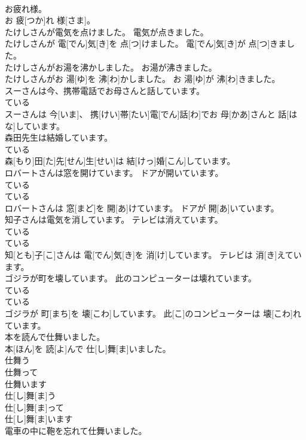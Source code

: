 \documentclass[8pt]{extreport}
\begin{document}
\begin{CJK}{UTF8}{min}
\\	お疲れ様。	
\\	お 疲[つか]れ 様[さま]。
\\	たけしさんが電気を点けました。 電気が点きました。	
\\	たけしさんが 電[でん]気[き]を 点[つ]けました。 電[でん]気[き]が 点[つ]きました。
\\	たけしさんがお湯を沸かしました。 お湯が沸きました。	
\\	たけしさんがお 湯[ゆ]を 沸[わ]かしました。 お 湯[ゆ]が 沸[わ]きました。
\\	スーさんは今、携帯電話でお母さんと話しています。	
\\	ている 
\\	スーさんは 今[いま]、 携[けい]帯[たい]電[でん]話[わ]でお 母[かあ]さんと 話[はな]しています。
\\	森田先生は結婚しています。	
\\	ている 
\\	森[もり]田[た]先[せん]生[せい]は 結[けっ]婚[こん]しています。
\\	ロバートさんは窓を開けています。 ドアが開いています。	
\\	ている 
\\	ている 
\\	ロバートさんは 窓[まど]を 開[あ]けています。 ドアが 開[あ]いています。
\\	知子さんは電気を消しています。 テレビは消えています。	
\\	ている 
\\	ている 
\\	知[とも]子[こ]さんは 電[でん]気[き]を 消[け]しています。 テレビは 消[き]えています。
\\	ゴジラが町を壊しています。 此のコンピューターは壊れています。	
\\	ている 
\\	ている 
\\	ゴジラが 町[まち]を 壊[こわ]しています。 此[こ]のコンピューターは 壊[こわ]れています。
\\	本を読んで仕舞いました。	
\\	本[ほん]を 読[よ]んで 仕[し]舞[ま]いました。
\\	仕舞う 
\\	仕舞って 
\\	仕舞います	
\\	仕[し]舞[ま]う 
\\	仕[し]舞[ま]って 
\\	仕[し]舞[ま]います	
\\	電車の中に鞄を忘れて仕舞いました。	

\end{CJK}
\end{document}
